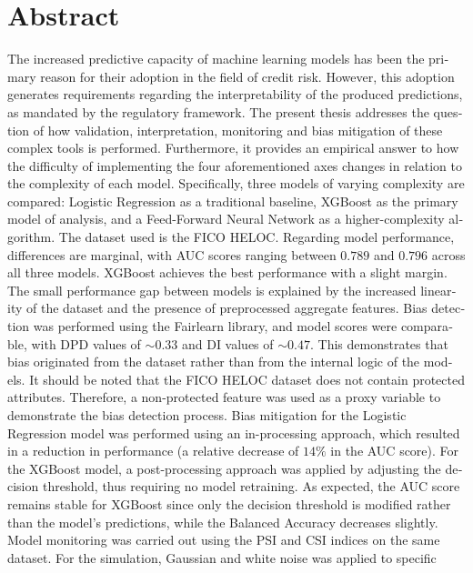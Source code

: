 \chapter*{Abstract}
\begin{english}

The increased predictive capacity of machine learning models has been the primary
reason for their adoption in the field of credit risk. However, this adoption
generates requirements regarding the interpretability of the produced predictions,
as mandated by the regulatory framework. The present thesis addresses the question
of how validation, interpretation, monitoring and bias mitigation of these complex
tools is performed. Furthermore, it provides an empirical answer to how the
difficulty of implementing the four aforementioned axes changes in relation to the
complexity of each model. Specifically, three models of varying complexity are
compared: Logistic Regression as a traditional baseline, XGBoost as the primary
model of analysis, and a Feed-Forward Neural Network as a higher-complexity
algorithm. The dataset used is the FICO HELOC. Regarding model performance,
differences are marginal, with AUC scores ranging between $0{.}789$ and $0{.}796$
across all three models. XGBoost achieves the best performance with a slight
margin. The small performance gap between models is explained by the increased
linearity of the dataset and the presence of preprocessed aggregate features.
Bias detection was performed using the Fairlearn library, and model scores were
comparable, with DPD values of ${\sim}0{.}33$ and DI values of ${\sim}0{.}47$.
This demonstrates that bias originated from the dataset rather than from the
internal logic of the models. It should be noted that the FICO HELOC dataset
does not contain protected attributes. Therefore, a non-protected feature was
used as a proxy variable to demonstrate the bias detection process. Bias mitigation for the
Logistic Regression model was performed using an in-processing approach, which
resulted in a reduction in performance (a relative decrease of $14\%$ in the AUC
score). For the XGBoost model, a post-processing approach was applied by adjusting
the decision threshold, thus requiring no model retraining. As expected, the AUC
score remains stable for XGBoost since only the decision threshold is modified
rather than the model's predictions, while the Balanced Accuracy decreases
slightly. Model monitoring was carried out using the PSI and CSI indices on the
same dataset. For the simulation, Gaussian and white noise was applied to specific

\end{english}
